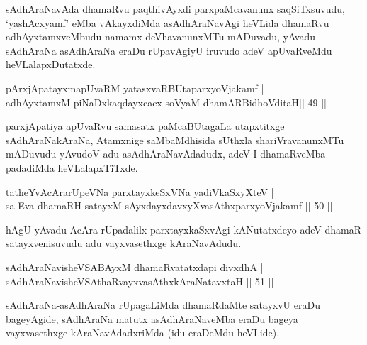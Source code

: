 \begin{artha}
sAdhAraNavAda dhamaRvu paqthivAyxdi parxpaMcavanunx saqSiTxsuvudu, `yashAcxyamf' eMba vAkayxdiMda asAdhAraNavAgi heVLida dhamaRvu adhAyxtamxveMbudu namamx deVhavanunxMTu mADuvadu, yAvadu sAdhAraNa asAdhAraNa  eraDu rUpavAgiyU iruvudo adeV apUvaRveMdu heVLalapxDutatxde.
\end{artha}

\begin{shl}
pArxjApatayxmapUvaRM yatasxvaRBUtaparxyoVjakamf |\\
adhAyxtamxM piNaDxkaqdayxcacx soV\s yaM dhamARBidhoVditaH\hfill  || 49 ||
\end{shl}

\begin{artha}
parxjApatiya apUvaRvu samasatx paMcaBUtagaLa utapxtitxge
sAdhAraNakAraNa, Atamxnige saMbaMdhisida sUthxla shariVravanunxMTu
mADuvudu yAvudoV adu asAdhAraNavAdadudx, adeV I dhamaRveMba padadiMda heVLalapxTiTxde.
\end{artha}


\begin{shl}
tatheYvA\s \s cArarUpeVNa parxtayxkeSxVNa yadiVkaSxyXteV |\\
sa Eva  dhamaRH satayxM sAyxdayxdavxyXvasAthxparxyoVjakamf \hfill || 50 ||
\end{shl}

\begin{artha}
hAgU yAvadu AcAra rUpadalilx parxtayxkaSxvAgi kANutatxdeyo adeV dhamaR satayxvenisuvudu adu vayxvasethxge kAraNavAdudu.
\end{artha}


\begin{shl}
sAdhAraNavisheVSABAyxM dhamaRvatatxdapi divxdhA |\\
sAdhAraNavisheVSAthaRvayx\footnotemark[1]vasAthxkAraNatavxtaH \hfill || 51 ||
\end{shl}

\begin{artha}
sAdhAraNa-asAdhAraNa rUpagaLiMda dhamaRdaMte satayxvU eraDu bageyAgide, sAdhAraNa matutx asAdhAraNaveMba eraDu bageya vayxvasethxge kAraNavAdadxriMda (idu eraDeMdu heVLide).
\end{artha}

